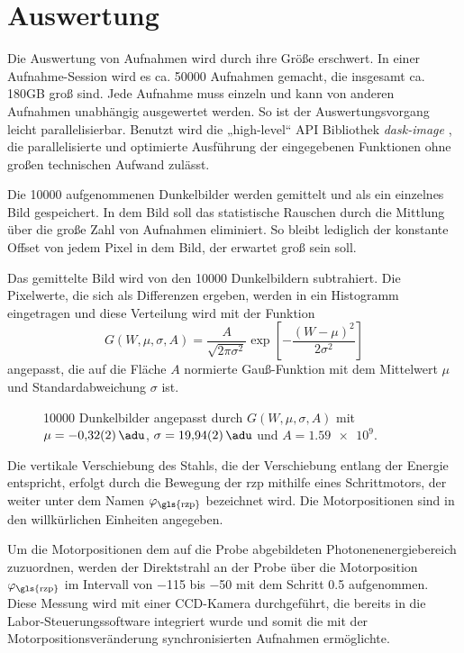 \chapter{Auswertung}
\label{text:auswertung}
Die Auswertung von Aufnahmen wird durch ihre Größe erschwert. In einer Aufnahme-Session wird es ca. \num{50000} Aufnahmen gemacht, die insgesamt ca. 180GB groß sind. Jede Aufnahme muss einzeln und kann von anderen Aufnahmen unabhängig ausgewertet werden. So ist der Auswertungsvorgang leicht parallelisierbar. Benutzt wird die „high-level“ API Bibliothek \textit{dask-image} \cite{dask-library}, die parallelisierte und optimierte Ausführung der eingegebenen Funktionen ohne großen technischen Aufwand zulässt.

\noindent
Die \num{10000} aufgenommenen Dunkelbilder werden gemittelt und als ein einzelnes Bild gespeichert. In dem Bild soll das statistische Rauschen durch die Mittlung über die große Zahl von Aufnahmen eliminiert. So bleibt lediglich der konstante Offset von jedem Pixel in dem Bild, der erwartet groß sein soll. 

\noindent
Das gemittelte Bild wird von den \num{10000} Dunkelbildern  subtrahiert. Die Pixelwerte, die sich als Differenzen ergeben, werden in ein Histogramm eingetragen und diese Verteilung wird mit der Funktion
\begin{equation}
    G(W, \mu, \sigma, A) = \frac{A}{\sqrt{2\pi \sigma^2}}\exp\left[-\frac{(W - \mu)^2}{2\sigma^2}\right]
    \label{eq:gauss_funktion}
\end{equation}
angepasst, die auf die Fläche $A$ normierte Gauß-Funktion mit dem Mittelwert $\mu$ und Standardabweichung $\sigma$ ist.
\begin{figure}[H]
    \centering
    
    \caption{\num{10000} Dunkelbilder angepasst durch $G(W,\mu,\sigma, A)$ mit $\mu= \SI{-0.32(2)}{\adu}$, $\sigma = \SI{19.94(2)}{\adu}$ und $A = \num{1.59e9}$.}
    \label{fig:noise_hist_fit}
\end{figure}
\noindent
Die vertikale Verschiebung des Stahls, die der Verschiebung entlang der Energie entspricht, erfolgt durch die Bewegung der \gls{rzp} mithilfe eines Schrittmotors, der weiter unter dem Namen $\varphi_\text{\gls{rzp}}$ bezeichnet wird. Die Motorpositionen sind in den willkürlichen Einheiten angegeben.

\noindent
Um die Motorpositionen dem auf die Probe abgebildeten Photonenenergiebereich zuzuordnen, werden der Direktstrahl an der Probe über die Motorposition $\varphi_\text{\gls{rzp}}$ im Intervall von \num{-115} bis \num{-50} mit dem Schritt \num{0,5} aufgenommen. Diese Messung wird mit einer CCD-Kamera durchgeführt, die bereits in die Labor-Steuerungssoftware integriert wurde und somit die mit der Motorpositionsveränderung synchronisierten Aufnahmen ermöglichte. 

